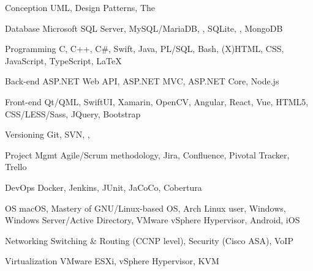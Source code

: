 

\begin{cvskills}

  \cvskill
    {Conception} %
    {UML, Design Patterns, The } %

  \cvskill
    {Database} %
    {Microsoft SQL Server, MySQL/MariaDB, , SQLite, , MongoDB} %

  \cvskill
    {Programming} %
    {C, C++, C\#, Swift, Java, PL/SQL, Bash, (X)HTML, CSS, JavaScript, TypeScript, \LaTeX} %

  \cvskill
    {Back-end} %
    {ASP.NET Web API, ASP.NET MVC, ASP.NET Core, Node.js} %

  \cvskill
    {Front-end} %
    {Qt/QML, SwiftUI, Xamarin, OpenCV, Angular, React, Vue, HTML5, CSS/LESS/Sass, JQuery, Bootstrap} %

  \cvskill
    {Versioning} %
    {Git, SVN, , } %

  \cvskill
    {Project Mgmt} %
    {Agile/Scrum methodology, Jira, Confluence, Pivotal Tracker, Trello} %

  \cvskill
    {DevOps} %
    {Docker, Jenkins, JUnit, JaCoCo, Cobertura} %

  \cvskill
    {OS} %
    {macOS, Mastery of GNU/Linux-based OS, Arch Linux user, Windows, Windows Server/Active Directory, VMware vSphere Hypervisor, Android, iOS} %

  \cvskill
    {Networking} %
    {Switching \& Routing (CCNP level), Security (Cisco ASA), VoIP} %

  \cvskill
    {Virtualization} %
    {VMware ESXi, vSphere Hypervisor, KVM} %


\end{cvskills}


